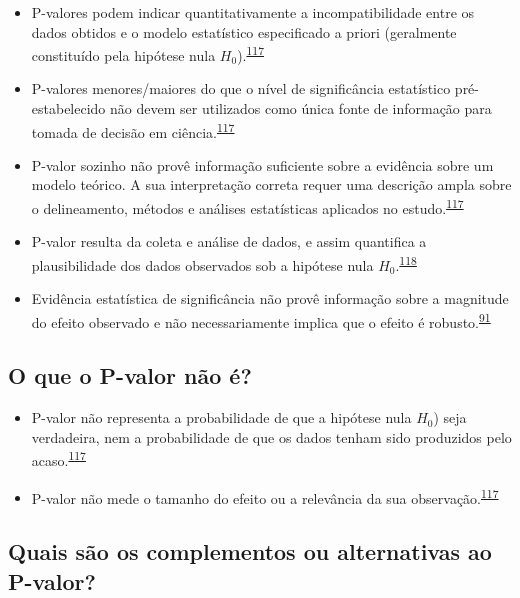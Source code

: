\documentclass[
  a4paper,
]{book}
\begin{document}
\begin{itemize}
\item
  P-valores podem indicar quantitativamente a incompatibilidade entre os dados obtidos e o modelo estatístico especificado a priori (geralmente constituído pela hipótese nula \(H_{0}\)).\textsuperscript{\protect\hyperlink{ref-wasserstein2016}{117}}
\item
  P-valores menores/maiores do que o nível de significância estatístico pré-estabelecido não devem ser utilizados como única fonte de informação para tomada de decisão em ciência.\textsuperscript{\protect\hyperlink{ref-wasserstein2016}{117}}
\item
  P-valor sozinho não provê informação suficiente sobre a evidência sobre um modelo teórico. A sua interpretação correta requer uma descrição ampla sobre o delineamento, métodos e análises estatísticas aplicados no estudo.\textsuperscript{\protect\hyperlink{ref-wasserstein2016}{117}}
\item
  P-valor resulta da coleta e análise de dados, e assim quantifica a plausibilidade dos dados observados sob a hipótese nula \(H_{0}\).\textsuperscript{\protect\hyperlink{ref-heinze2016}{118}}
\item
  Evidência estatística de significância não provê informação sobre a magnitude do efeito observado e não necessariamente implica que o efeito é robusto.\textsuperscript{\protect\hyperlink{ref-Landis2012}{91}}
\end{itemize}

\hypertarget{o-que-o-p-valor-nuxe3o-uxe9}{%
\subsection{O que o P-valor não é?}\label{o-que-o-p-valor-nuxe3o-uxe9}}

\begin{itemize}
\item
  P-valor não representa a probabilidade de que a hipótese nula \(H_{0}\)) seja verdadeira, nem a probabilidade de que os dados tenham sido produzidos pelo acaso.\textsuperscript{\protect\hyperlink{ref-wasserstein2016}{117}}
\item
  P-valor não mede o tamanho do efeito ou a relevância da sua observação.\textsuperscript{\protect\hyperlink{ref-wasserstein2016}{117}}
\end{itemize}

\hypertarget{quais-suxe3o-os-complementos-ou-alternativas-ao-p-valor}{%
\subsection{Quais são os complementos ou alternativas ao P-valor?}\label{quais-suxe3o-os-complementos-ou-alternativas-ao-p-valor}}
\end{document}
